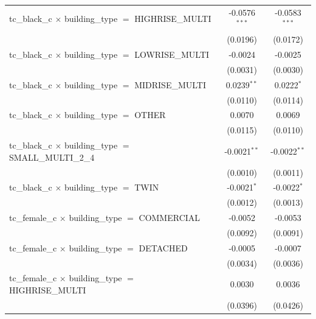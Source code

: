 \begin{tabular}{lcc}
   tc\_black\_c $\times$ building\_type $=$ HIGHRISE\_MULTI            & -0.0576$^{***}$ & -0.0583$^{***}$\\   
                                                                       & (0.0196)        & (0.0172)\\   
   tc\_black\_c $\times$ building\_type $=$ LOWRISE\_MULTI             & -0.0024         & -0.0025\\   
                                                                       & (0.0031)        & (0.0030)\\   
   tc\_black\_c $\times$ building\_type $=$ MIDRISE\_MULTI             & 0.0239$^{**}$   & 0.0222$^{*}$\\   
                                                                       & (0.0110)        & (0.0114)\\   
   tc\_black\_c $\times$ building\_type $=$ OTHER                      & 0.0070          & 0.0069\\   
                                                                       & (0.0115)        & (0.0110)\\   
   tc\_black\_c $\times$ building\_type $=$ SMALL\_MULTI\_2\_4         & -0.0021$^{**}$  & -0.0022$^{**}$\\   
                                                                       & (0.0010)        & (0.0011)\\   
   tc\_black\_c $\times$ building\_type $=$ TWIN                       & -0.0021$^{*}$   & -0.0022$^{*}$\\   
                                                                       & (0.0012)        & (0.0013)\\   
   tc\_female\_c $\times$ building\_type $=$ COMMERCIAL                & -0.0052         & -0.0053\\   
                                                                       & (0.0092)        & (0.0091)\\   
   tc\_female\_c $\times$ building\_type $=$ DETACHED                  & -0.0005         & -0.0007\\   
                                                                       & (0.0034)        & (0.0036)\\   
   tc\_female\_c $\times$ building\_type $=$ HIGHRISE\_MULTI           & 0.0030          & 0.0036\\   
                                                                       & (0.0396)        & (0.0426)\\   

\end{tabular}
